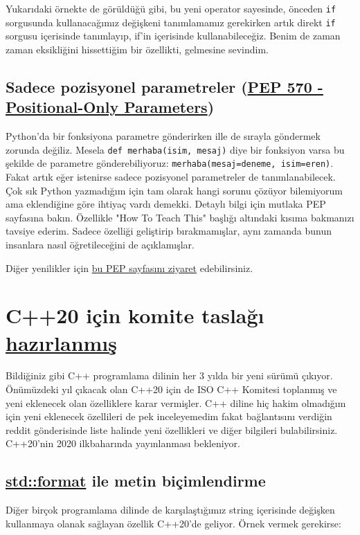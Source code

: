 \documentclass[11pt]{article}
\begin{document}
Yukarıdaki örnekte de görüldüğü gibi, bu yeni operator sayesinde, önceden
\texttt{if} sorgusunda kullanacağımız değişkeni tanımlamamız gerekirken artık direkt
\texttt{if} sorgusu içerisinde tanımlayıp, if'in içerisinde kullanabileceğiz. Benim
de zaman zaman eksikliğini hissettiğim bir özellikti, gelmesine sevindim.
\subsection{Sadece pozisyonel parametreler (\href{https://www.python.org/dev/peps/pep-0570/}{PEP 570 - Positional-Only Parameters})}
\label{sec:org150f7bc}
Python'da bir fonksiyona parametre gönderirken ille de sırayla göndermek
zorunda değiliz. Mesela \texttt{def merhaba(isim, mesaj)} diye bir fonksiyon varsa
bu şekilde de parametre gönderebiliyoruz: \texttt{merhaba(mesaj=deneme, isim=eren)}.
Fakat artık eğer istenirse sadece pozisyonel parametreler de
tanımlanabilecek. Çok sık Python yazmadığım için tam olarak hangi sorunu
çözüyor bilemiyorum ama eklendiğine göre ihtiyaç vardı demekki. Detaylı bilgi
için mutlaka PEP sayfasına bakın. Özellikle "How To Teach This" başlığı
altındaki kısıma bakmanızı tavsiye ederim. Sadece özelliği geliştirip
bırakmamışlar, aynı zamanda bunun insanlara nasıl öğretileceğini de
açıklamışlar.

Diğer yenilikler için \href{https://www.python.org/dev/peps/pep-0569/\#features-for-3-8}{bu PEP sayfasını ziyaret} edebilirsiniz.
\section{C++20 için komite taslağı \href{https://www.reddit.com/r/cpp/comments/cfk9de/201907\_cologne\_iso\_c\_committee\_trip\_report\_the/}{hazırlanmış}}
\label{sec:org373ef23}
Bildiğiniz gibi C++ programlama dilinin her 3 yılda bir yeni sürümü çıkıyor.
Önümüzdeki yıl çıkacak olan C++20 için de ISO C++ Komitesi toplanmış ve yeni
eklenecek olan özelliklere karar vermişler. C++ diline hiç hakim olmadığım için
yeni eklenecek özellileri de pek inceleyemedim fakat bağlantısını verdiğin
reddit gönderisinde liste halinde yeni özellikleri ve diğer bilgileri
bulabilirsiniz. C++20'nin 2020 ilkbaharında yayınlanması bekleniyor.
\subsection{\href{http://www.open-std.org/jtc1/sc22/wg21/docs/papers/2019/p0645r9.html}{std::format} ile metin biçimlendirme}
\label{sec:org103d0b6}
Diğer birçok programlama dilinde de karşılaştığımız string içerisinde değişken
kullanmaya olanak sağlayan özellik C++20'de geliyor. Örnek vermek gerekirse:
\end{document}
